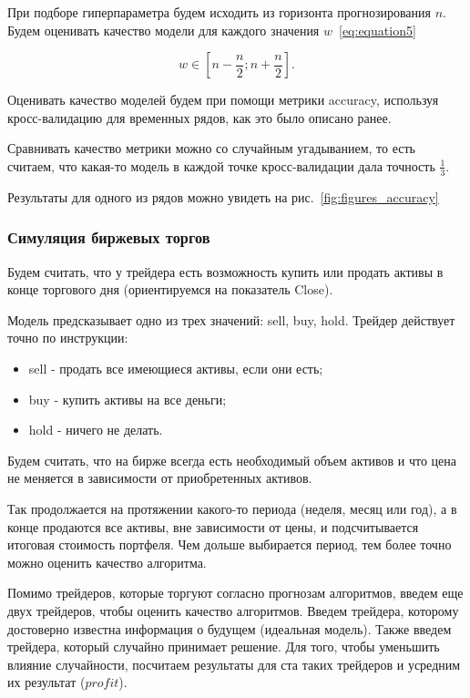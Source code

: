 \documentclass[a4paper,article,14pt]{extarticle}
\begin{document}
При подборе гиперпараметра будем исходить из горизонта прогнозирования $n$.
Будем оценивать качество модели для каждого значения $w$~\eqref{eq:equation5}

\begin{equation}
    \label{eq:equation5}
    w \in \left[ n - \frac{n}{2}; n + \frac{n}{2} \right].
\end{equation}

Оценивать качество моделей будем при помощи метрики accuracy, используя кросс-валидацию для временных рядов, как это было описано ранее.

Сравнивать качество метрики можно со случайным угадыванием, то есть считаем, что какая-то модель в каждой точке кросс-валидации дала точность $\frac{1}{3}$.

Результаты для одного из рядов можно увидеть на рис.~\ref{fig:figures_accuracy}


\subsubsection{Симуляция биржевых торгов}

Будем считать, что у трейдера есть возможность купить или продать активы в конце торгового дня (ориентируемся на показатель Close).

Модель предсказывает одно из трех значений: sell, buy, hold.
Трейдер действует точно по инструкции:

\begin{itemize}
    \item sell - продать все имеющиеся активы, если они есть;
    \item buy - купить активы на все деньги;
    \item hold - ничего не делать.
\end{itemize}

Будем считать, что на бирже всегда есть необходимый объем активов и что цена не меняется в зависимости от приобретенных активов.
\par

Так продолжается на протяжении какого-то периода (неделя, месяц или год), а в конце продаются все активы, вне зависимости от цены, и подсчитывается итоговая стоимость портфеля.
Чем дольше выбирается период, тем более точно можно оценить качество алгоритма.
\par

Помимо трейдеров, которые торгуют согласно прогнозам алгоритмов, введем еще двух трейдеров, чтобы оценить качество алгоритмов.
Введем трейдера, которому достоверно известна информация о будущем (идеальная модель).
Также введем трейдера, который случайно принимает решение.
Для того, чтобы уменьшить влияние случайности, посчитаем результаты для ста таких трейдеров и усредним их результат ($profit$).
\end{document}
